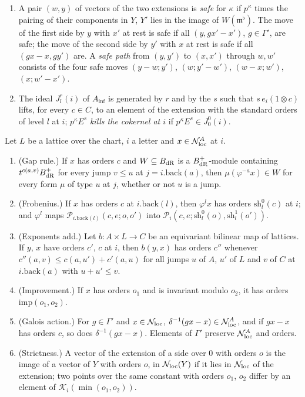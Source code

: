 \begin{definition}
\begin{enumerate}[label=\textup{(O\arabic*)}]
\item A pair $(w,y)$ of vectors of the two extensions is \emph{safe} for $\kappa$ if $p^\kappa$ times the pairing of their components in $Y$, $Y'$ lies in the image of $W(\mathfrak m^\flat)$. The move of the first side by $y$ with $x'$ at rest is safe if all $(y,gx'-x')$, $g\in\Gamma'$, are safe;
the move of the second side by $y'$ with $x$ at rest is safe if all $(gx-x,gy')$ are. A \emph{safe path} from $(y,y')$ to $(x,x')$ through $w,w'$ consists of the four safe moves $(y-w;y')$, $(w;y'-w')$, $(w-x;w')$, $(x;w'-x')$.
\item The ideal $J^r_l(i)$ of $A_{\inf}$ is generated by $r$ and by the $s$ such that $s\,e_i(1\otimes c)$ lifts, for every $c\in C$, to an element of the extension with the standard orders of level $l$ at $i$; $p^\kappa E^s$ \emph{kills the cokernel at $i$} if $p^\kappa E^s\in J^0_0(i)$.
\end{enumerate}
\end{definition}

\begin{lemma}[Orders]\label{lem:orders}
Let $L$ be a lattice over the chart, $i$ a letter and $x\in\mathcal N^A_{\rm loc}$ at $i$.
\begin{enumerate}[label=\textup{(\alph*)}]
\item (Gap rule.) If $x$ has orders $c$ and $W\subseteq B_{\rm dR}$ is a $B_{\rm dR}^+$-module containing $t^{c(a,v)}B_{\rm dR}^+$ for every jump $v\le u$ at $j=i.\mathrm{back}(a)$, then $\mu(\varphi^{-a}x)\in W$ for every form $\mu$ of type $u$ at $j$, whether or not $u$ is a jump.
\item (Frobenius.) If $x$ has orders $c$ at $i.\mathrm{back}(l)$, then $\varphi^lx$ has orders $\mathrm{sh}^0_l(c)$ at $i$; and $\varphi^l$ maps $\mathcal P_{i.\mathrm{back}(l)}(c,e;o,o')$ into $\mathcal P_i(c,e;\mathrm{sh}^0_l(o),\mathrm{sh}^1_l(o'))$.
\item (Exponents add.) Let $b\colon A\times L\to C$ be an equivariant bilinear map of lattices. If $y$, $x$ have orders $c'$, $c$ at $i$, then $b(y,x)$ has orders $c''$ whenever $c''(a,v)\le c(a,u')+c'(a,u)$ for all jumps $u$ of $A$, $u'$ of $L$ and $v$ of $C$ at $i.\mathrm{back}(a)$ with
$u+u'\le v$.
\item (Improvement.) If $x$ has orders $o_1$ and is invariant modulo $o_2$, it has orders $\mathrm{imp}(o_1,o_2)$.
\item (Galois action.) For $g\in\Gamma'$ and $x\in\mathcal N_{\rm loc}$, $\delta^{-1}(gx-x)\in\mathcal N^A_{\rm loc}$, and if $gx-x$ has orders $c$, so does $\delta^{-1}(gx-x)$. Elements of $\Gamma'$ preserve $\mathcal N^A_{\rm loc}$ and orders.
\item (Strictness.) A vector of the extension of a side over $0$ with orders $o$ is the image of a vector of $Y$ with orders $o$, in $\mathcal N_{\rm loc}(Y)$ if it lies in $\mathcal N_{\rm loc}$ of the extension; two points over the same constant with orders $o_1$, $o_2$ differ by an element of $\mathcal K_i(\min(o_1,o_2))$.
\end{enumerate}
\end{lemma}

